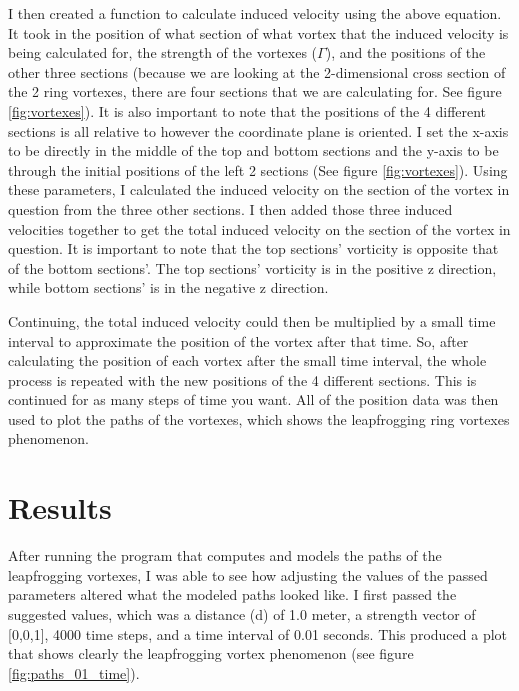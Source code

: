 \documentclass{article}
\begin{document}
I then created a function to calculate induced velocity using the above equation. It took in the position of what section of what vortex that the induced velocity is being calculated for, the strength of the vortexes (\(\Gamma\)), and the positions of the other three sections (because we are looking at the 2-dimensional cross section of the 2 ring vortexes, there are four sections that we are calculating for. See figure \ref{fig:vortexes}). It is also important to note that the positions of the 4 different sections is all relative to however the coordinate plane is oriented. I set the x-axis to be directly in the middle of the top and bottom sections and the y-axis to be through the initial positions of the left 2 sections (See figure \ref{fig:vortexes}). Using these parameters, I calculated the induced velocity on the section of the vortex in question from the three other sections. I then added those three induced velocities together to get the total induced velocity on the section of the vortex in question. It is important to note that the top sections' vorticity is opposite that of the bottom sections'. The top sections' vorticity is in the positive z direction, while bottom sections' is in the negative z direction.

Continuing, the total induced velocity could then be multiplied by a small time interval to approximate the position of the vortex after that time. So, after calculating the position of each vortex after the small time interval, the whole process is repeated with the new positions of the 4 different sections. This is continued for as many steps of time you want. All of the position data was then used to plot the paths of the vortexes, which shows the leapfrogging ring vortexes phenomenon.

\section{Results}
After running the program that computes and models the paths of the leapfrogging vortexes, I was able to see how adjusting the values of the passed parameters altered what the modeled paths looked like. I first passed the suggested values, which was a distance (d) of 1.0 meter, a strength vector of [0,0,1], 4000 time steps, and a time interval of 0.01 seconds. This produced a plot that shows clearly the leapfrogging vortex phenomenon (see figure \ref{fig:paths_01_time}).
\end{document}
